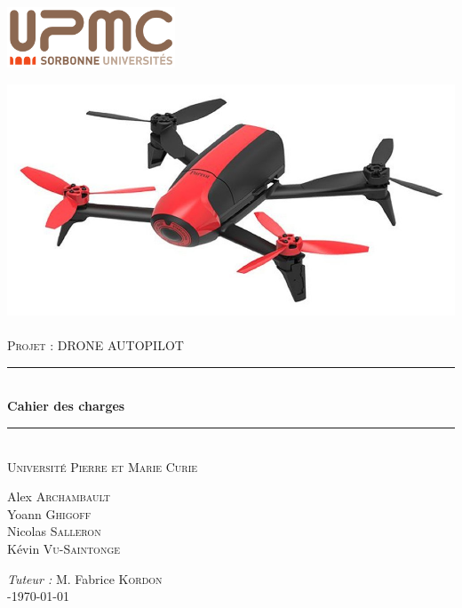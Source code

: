 \documentclass[12pt, openany]{report}
\newcommand{\HRule}{\rule{\linewidth}{0.5mm}}
\begin{document}
\begin{titlepage}
\includegraphics[width=5cm]{upmc.png}
\begin{sffamily}
\begin{center}
\includegraphics[scale=0.4]{img1.jpg}~\\[1cm]
\textsc{\Large Projet : DRONE AUTOPILOT}\\[1cm]

\HRule \\[0.4cm]
	 { \huge \bfseries Cahier des charges\\[0.4cm] }
 \HRule \\[2cm]
 
 \textsc{\LARGE Université Pierre et Marie Curie}\\[3cm]

\begin{minipage}{0.4\textwidth}
\begin{flushleft} \large
Alex \textsc{Archambault}\\
Yoann \textsc{Ghigoff}\\
Nicolas \textsc{Salleron}\\	%
Kévin \textsc{Vu-Saintonge}\\
\end{flushleft}
\end{minipage}
\begin{minipage}{0.4\textwidth}
\begin{flushright} \large
\emph{Tuteur :} M. Fabrice \textsc{Kordon}\\
-\today
\end{flushright}
\end{minipage}

\vfill

\end{center}
\end{sffamily}
\end{titlepage}
\end{document}
